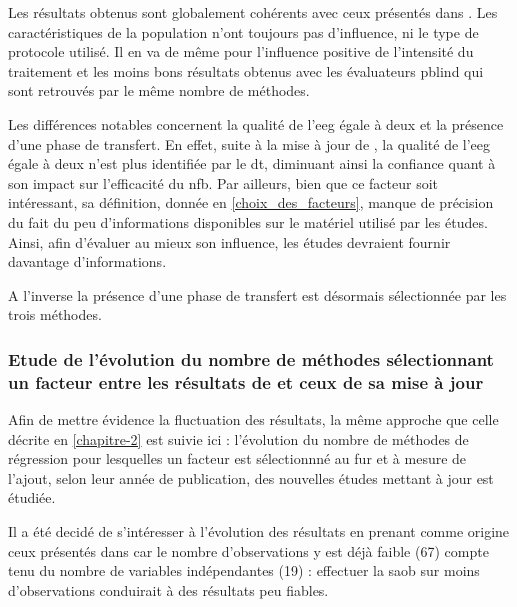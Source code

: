 Les résultats obtenus sont globalement cohérents avec ceux présentés dans \citet{Bussalb2019clinical}. Les caractéristiques de la population n'ont toujours pas d'influence, ni
le type de protocole utilisé. Il en va de même pour l'influence positive de l'intensité du traitement et les moins bons résultats obtenus avec les évaluateurs \gls{pblind} qui sont
retrouvés par le même nombre de méthodes. 

Les différences notables concernent la qualité de l'\gls{eeg} égale à deux et la présence d'une phase de transfert. En effet, suite à la mise à jour de \citet{Bussalb2019clinical}, 
la qualité de l'\gls{eeg} égale à deux 
n'est plus identifiée par le \gls{dt}, diminuant ainsi la confiance quant à son impact sur l'efficacité du \gls{nfb}. Par ailleurs, bien que ce facteur soit intéressant, sa définition, 
donnée en \ref{choix_des_facteurs}, manque de précision 
du fait du peu d'informations disponibles sur le matériel utilisé par les études. Ainsi, afin d'évaluer au mieux son influence, les études devraient fournir 
davantage d'informations.

A l'inverse la présence d'une phase de transfert est désormais sélectionnée par les trois méthodes.

\subsubsection{Etude de l'évolution du nombre de méthodes sélectionnant un facteur entre les résultats de \citet{Bussalb2019clinical} et ceux de sa mise à jour}
Afin de mettre évidence la fluctuation des résultats, la même approche que celle décrite en \ref{chapitre-2} est suivie ici : l'évolution du nombre de méthodes de régression pour 
lesquelles un facteur est sélectionnné au fur et à mesure de l'ajout,
selon leur année de publication, des nouvelles études mettant à jour \citet{Bussalb2019clinical} est étudiée. 

Il a été decidé de s'intéresser à l'évolution des résultats en prenant comme origine ceux présentés dans \citet{Bussalb2019clinical} car le nombre d'observations y est déjà faible (67) compte tenu du nombre 
de variables indépendantes (19) : effectuer la \gls{saob} sur moins d'observations conduirait à des résultats peu fiables. 

